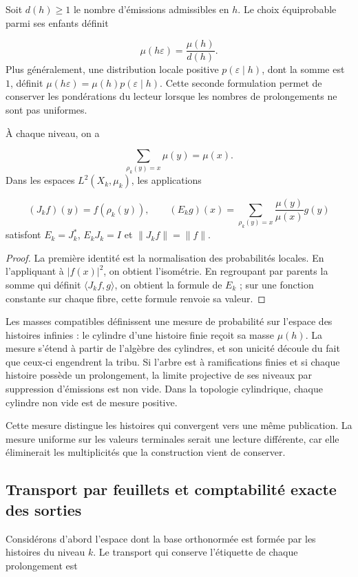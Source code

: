Soit \(d(h)\geq1\) le nombre d'émissions admissibles en \(h\). Le choix équiprobable parmi ses enfants définit

\[
\mu(h\varepsilon)=\frac{\mu(h)}{d(h)}.
\]
Plus généralement, une distribution locale positive \(p(\varepsilon\mid h)\), dont la somme est \(1\), définit \(\mu(h\varepsilon)=\mu(h)p(\varepsilon\mid h)\). Cette seconde formulation permet de conserver les pondérations du lecteur lorsque les nombres de prolongements ne sont pas uniformes.

\begin{proposition}
\label{x_reciprocidad:iv:cont:esperanza}
À chaque niveau, on a

\[
\sum_{\rho_k(y)=x}\mu(y)=\mu(x).
\]
Dans les espaces \(L^2(X_k,\mu_k)\), les applications

\[
(J_kf)(y)=f(\rho_k(y)),
\qquad
(E_kg)(x)=\sum_{\rho_k(y)=x}\frac{\mu(y)}{\mu(x)}g(y)
\]
satisfont \(E_k=J_k^*\), \(E_kJ_k=I\) et \(\|J_kf\|=\|f\|\).

\end{proposition}
\begin{proof}
La première identité est la normalisation des probabilités locales. En l'appliquant à \(|f(x)|^2\), on obtient l'isométrie. En regroupant par parents la somme qui définit \(\langle J_kf,g\rangle\), on obtient la formule de \(E_k\) ; sur une fonction constante sur chaque fibre, cette formule renvoie sa valeur.
\end{proof}

Les masses compatibles définissent une mesure de probabilité sur l’espace des histoires infinies : le cylindre d’une histoire finie reçoit sa masse \(\mu(h)\). La mesure s’étend à partir de l’algèbre des cylindres, et son unicité découle du fait que ceux-ci engendrent la tribu. Si l’arbre est à ramifications finies et si chaque histoire possède un prolongement, la limite projective de ses niveaux par suppression d’émissions est non vide. Dans la topologie cylindrique, chaque cylindre non vide est de mesure positive.

Cette mesure distingue les histoires qui convergent vers une même publication. La mesure uniforme sur les valeurs terminales serait une lecture différente, car elle éliminerait les multiplicités que la construction vient de conserver.

\subsection{Transport par feuillets et comptabilité exacte des sorties}
\label{x_reciprocidad:iv:cont:transporte}
Considérons d’abord l’espace dont la base orthonormée est formée par les histoires du niveau \(k\). Le transport qui conserve l’étiquette de chaque prolongement est


